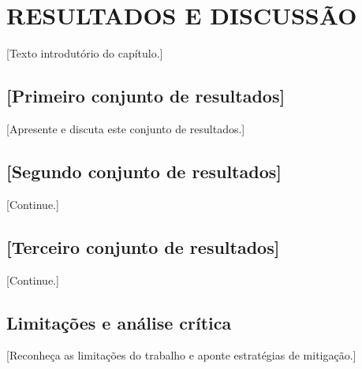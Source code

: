 %

\chapter{RESULTADOS E DISCUSSÃO}
\label{cap:resultados}

[Texto introdutório do capítulo.]

\section{[Primeiro conjunto de resultados]}
\label{sec:resultados-1}

[Apresente e discuta este conjunto de resultados.]


\section{[Segundo conjunto de resultados]}
\label{sec:resultados-2}

[Continue.]

\section{[Terceiro conjunto de resultados]}
\label{sec:resultados-3}

[Continue.]

\section{Limitações e análise crítica}
\label{sec:limitacoes}

[Reconheça as limitações do trabalho e aponte estratégias de mitigação.]
